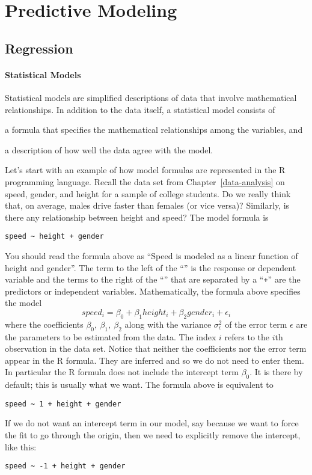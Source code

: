 \chapter{Predictive Modeling}

\section{Regression}

\subsubsection*{Statistical Models}

Statistical models are simplified descriptions of data that involve
mathematical relationships. In addition to the data itself,
a statistical model consists of \begin{inparaenum}[1)] \item a formula
  that specifies the mathematical relationships among the variables,
  and \item a description of how well the data agree with the model.
  \end{inparaenum} 
  Let's start with an example of how model formulas are represented in
  the R programming language. Recall the data set from
  Chapter~\ref{data-analysis} on speed, gender, and height for a
  sample of college students. Do we really think that, on average,
  males drive faster than females (or vice versa)? Similarly, is there
  any relationship between height and speed? The model formula is
\begin{Verbatim}
speed ~ height + gender
\end{Verbatim}
You should read the
formula above as ``Speed is modeled as a linear function of height and gender''.
The term to the left of the ``\mtilde'' is the
response or dependent variable and the terms to the right of the ``\mtilde''
that are separated by a ``\texttt{+}'' are the predictors or independent variables.
Mathematically, the formula
above specifies the model
\[
  speed_i = \beta_0 + \beta_1 height_i + \beta_2 gender_i + \epsilon_i
\]
where the coefficients $\beta_0,~\beta_1,~\beta_2$  along with the variance $\sigma_{\epsilon}^2$ of
the error term $\epsilon$ are the parameters to be estimated from the data.
The index $i$ refers to the $i$th observation in the data set.
Notice that neither the coefficients nor the error term appear in the R formula.
They are inferred and so we do not need to enter them. In particular
the R formula does not include the intercept term $\beta_0$. It is there
by default; this is usually what we want. The formula above is equivalent to
\begin{Verbatim}
speed ~ 1 + height + gender
\end{Verbatim}
If we do not want an intercept term in our model, say because we want to
force the fit to go through the origin, then we need to explicitly remove
the intercept, like this:
\begin{Verbatim}
speed ~ -1 + height + gender
\end{Verbatim}


